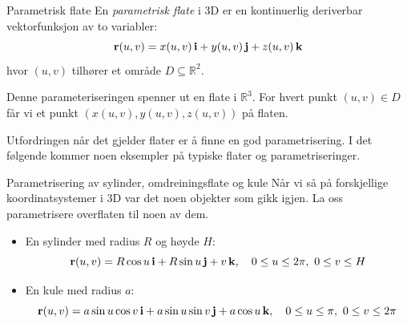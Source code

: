 \begin{defn}{Parametrisk flate}
En \emph{parametrisk flate} i 3D er en kontinuerlig deriverbar vektorfunksjon av to variabler:
\[
\mathbf{r}(u, v) = x(u, v)\, \mathbf{i} + y(u, v)\, \mathbf{j} + z(u, v)\, \mathbf{k}
\]
hvor \( (u, v) \) tilhører et område \( D \subseteq \mathbb{R}^2 \).

Denne parameteriseringen spenner ut en flate i \( \mathbb{R}^3 \). For hvert punkt \( (u, v) \in D \) får vi et punkt \( (x(u,v), y(u,v), z(u,v)) \) på flaten.
\end{defn}
Utfordringen når det gjelder flater er å finne en god parametrisering. I det følgende kommer noen eksempler på typiske flater og parametriseringer.
\begin{eks}{Parametrisering av sylinder, omdreiningsflate og kule}
Når vi så på forskjellige koordinatsystemer i 3D var det noen objekter som gikk igjen. La oss parametrisere overflaten til noen av dem. 
\begin{itemize}
    \item En sylinder med radius $R$ og høyde $H$:
    \[
    \mathbf{r}(u,v) = R\cos u\, \mathbf{i} + R\sin u\, \mathbf{j} + v\, \mathbf{k}, \quad 0 \leq u \leq 2\pi,\ 0 \leq v \leq H
    \]
    \item En kule med radius \( a \):
    \[
    \mathbf{r}(u,v) = a \sin u \cos v\, \mathbf{i} + a \sin u \sin v\, \mathbf{j} + a \cos u\, \mathbf{k}, \quad 0 \leq u \leq \pi,\ 0 \leq v \leq 2\pi
    \]
\end{itemize}
\end{eks}

